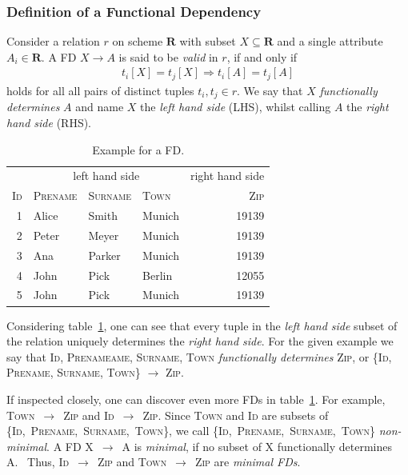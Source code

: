 \subsubsection{Definition of a Functional Dependency}
Consider a relation \(r\) on scheme \(\boldsymbol{R}\) with subset \(X \subseteq \boldsymbol{R}\) and a single attribute \(A_i \in \boldsymbol{R}\).
A FD \(X \to A\) is said to be \emph{valid} in \(r\), if and only if
\begin{align}
    t_i[X] = t_j[X] \Rightarrow t_i[A] = t_j[A] \label{eq:fd-condition}
\end{align}
holds for all all pairs of distinct tuples \(t_i,t_j \in r\).\cite[p.~21]{ABE19}
We say that \(X\) \emph{functionally determines} \(A\)\cite[p.~43]{MAI83} and name \(X\) the \emph{left hand side} (LHS), whilst calling \(A\) the \emph{right hand side} (RHS).

\begin{table}[ht]
    \centering
    \begin{tabular}{rlllr}
        \toprule
        & \multicolumn{3}{c}{left hand side} & \multicolumn{1}{c}{right hand side} \\ \cmidrule(lr{.25em}){1-4} \cmidrule(l{4.75em}){4-5}
        \textsc{Id} & \textsc{Prename} & \textsc{Surname} & \textsc{Town} & \textsc{Zip} \\
        \midrule
        1 & Alice & Smith & Munich & 19139 \\
        2 & Peter& Meyer & Munich & 19139 \\
        3 & Ana & Parker & Munich & 19139  \\
        4 & John & Pick & Berlin & 12055 \\
        5 & John & Pick & Munich & 19139 \\
        \bottomrule
    \end{tabular}
    \caption{Example for a FD.}\label{tab:fd-example}
\end{table}

Considering table~\ref{tab:fd-example}, one can see that every tuple in the \emph{left hand side} subset of the relation uniquely determines the \emph{right hand side}.
For the given example we say that \textsc{Id}, \textsc{Prenameame}, \textsc{Surname}, \textsc{Town} \emph{functionally determines} \textsc{Zip}, or \{\textsc{Id}, \textsc{Prename}, \textsc{Surname}, \textsc{Town}\} \( \rightarrow \) \textsc{Zip}.~\cite[p.~43]{MAI83}

If inspected closely, one can discover even more FDs in table~\ref{tab:fd-example}.
For example, \textsc{Town}~\( \rightarrow \)~\textsc{Zip} and \textsc{Id}~\( \rightarrow \)~\textsc{Zip}.
Since \textsc{Town} and \textsc{Id} are subsets of \{\textsc{Id},~\textsc{Prename},~\textsc{Surname},~\textsc{Town}\}, we call \{\textsc{Id},~\textsc{Prename},~\textsc{Surname},~\textsc{Town}\} \emph{non-minimal}.
A FD X~\( \rightarrow \)~A is \emph{minimal}, if no subset of X functionally determines A.~\cite[p.~2]{PAP15}
Thus, \textsc{Id}~\( \rightarrow \)~\textsc{Zip} and \textsc{Town}~\( \rightarrow \)~\textsc{Zip} are \emph{minimal FDs}.

